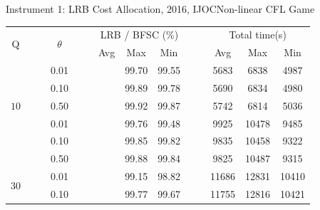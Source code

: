 \documentclass[14pt]{beamer}
\begin{document}
\begin{frame}{Instrument 1: LRB Cost Allocation, {\footnotesize 2016, IJOC}}{Non-linear CFL Game}
\scriptsize
\vspace{-0.5em}
\begin{table}[H]
\centering
\tabcolsep=6pt
\scriptsize
\renewcommand\arraystretch{1.3}
\setlength{\abovecaptionskip}{100pt}
\setlength{\belowcaptionskip}{100pt}
\vspace{-0.5em}
\begin{tabular}[!h]{c c c c c c c c c c c c c c}
\hline
\multirow{2}{*}{Q} &\multicolumn{2}{c}{} &\multirow{2}{*}{$\theta$} &\multicolumn{2}{c}{} & \multicolumn{3}{c}{LRB / BFSC (\%)}  &\multicolumn{2}{c}{} & \multicolumn{3}{c}{Total time(s)}\\
\cline{7-9}
\cline{12-14}
&  &&&&& Avg & Max &Min  &&& Avg & Max &Min\\
\hline
\multirow{5}{*}{$10$}

&&&0.01  && &{\color{teal}{\bf 99.64}}	&99.70	&99.55	&&	&5683	&6838	&4987\\

&&&0.10   && &{\color{teal}{\bf 99.87}}	&99.89	&99.78	&&	&5690	&6834	&4980\\

&&&0.50	&& &{\color{teal}{\bf 99.90}}	&99.92	&99.87	&&	&5742	&6814	&5036\\
\hline
\multirow{5}{*}{$20$}

&&&0.01    && &{\color{teal}{\bf 99.61}}	&99.76	&99.48	&&	&9925	&10478	&9485\\

&&&0.10    && &{\color{teal}{\bf 99.83}}	&99.85	&99.82	&&	&9835	&10458	&9322\\

&&&0.50   && &{\color{teal}{\bf 99.85}}	&99.88	&99.84	&&	&9825	&10487	&9315\\
\hline
\multirow{5}{*}{$30$}

&&&0.01    && &{\color{teal}{\bf 99.02}}	&99.15	&98.82	&&	&11686	&12831	&10410\\

&&&0.10    && &{\color{teal}{\bf 99.73}}	&99.77	&99.67	&&	&11755	&12816	&10421\\


\end{tabular}
\end{table}
\end{frame}
\end{document}
